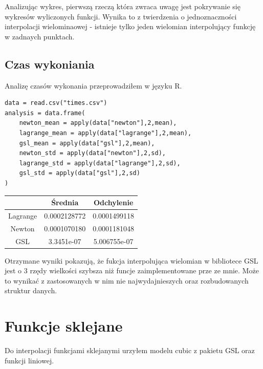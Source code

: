 \documentclass{article}
\begin{document}
    Analizując wykres, pierwszą rzeczą która zwraca uwagę jest pokrywanie się wykresów wyliczonych funkcji. 
    Wynika to z twierdzenia o jednoznaczności interpolacji wielominaowej - istnieje tylko jeden wielomian interpolujący funkcję w zadnaych punktach.

    \subsection{Czas wykoniania}
    Analizę czasów wykonania przeprowadziłem w języku R. 

    \lstset {language=R}
    \begin{lstlisting}[caption={Analiza czasów wykonań w R}]
data = read.csv("times.csv")
analysis = data.frame(
    newton_mean = apply(data["newton"],2,mean),
    lagrange_mean = apply(data["lagrange"],2,mean),
    gsl_mean = apply(data["gsl"],2,mean),
    newton_std = apply(data["newton"],2,sd),
    lagrange_std = apply(data["lagrange"],2,sd),
    gsl_std = apply(data["gsl"],2,sd)
)
    \end{lstlisting}

    \vspace{10px}

    \begin{tabular}{|c|c|c|}
        \hline 
        &Średnia&Odchylenie\\
        \hline 
        Lagrange&0.0002128772&0.0001499118\\
        \hline 
        Newton&0.0001070180&0.0001181048\\
        \hline 
        GSL&3.3451e-07&5.006755e-07\\
        \hline 
    \end{tabular}

    \vspace{10px}
    
    Otrzymane wyniki pokazują, że fukcja interpolująca wielomian w bibliotece GSL jest o 3 rzędy wielkości szybsza niż funcje zaimplementowane prze ze mnie. 
    Może to wynikać z zastosowanych w nim nie najwydajnieszych oraz rozbudowanych struktur danych. 

    \pagebreak

    \section{Funkcje sklejane}
    Do interpolacji funkcjami sklejanymi urzyłem modelu cubic z pakietu GSL oraz funkcji liniowej.
    
\end{document}
